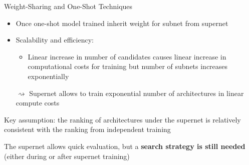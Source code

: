 \documentclass[main]{subfiles}
\begin{document}
\begin{frame}{Weight-Sharing and One-Shot Techniques}
\begin{itemize}
    \item Once one-shot model trained inherit weight for subnet from supernet 
    \item Scalability and efficiency:
    \begin{itemize}
        \item Linear increase in number of candidates causes linear increase in computational costs for training but number of subnets increases exponentially 
    \end{itemize}
$\rightsquigarrow$ Supernet allows to train exponential number of architectures in linear compute costs
\end{itemize}
\vspace{0.4em}
\alert{Key assumption}: the ranking of architectures under the supernet is relatively consistent with the ranking from independent training

\vspace{0.4em}
The supernet allows quick evaluation, but a \textbf{search strategy is still needed} (either during or after supernet training)
\end{frame}

\end{document}
